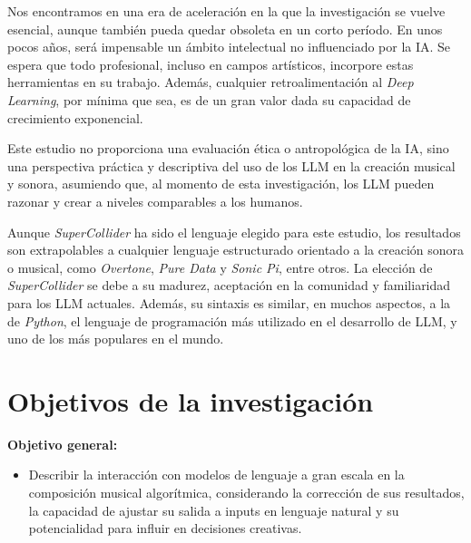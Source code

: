 Nos encontramos en una era de aceleración en la que la investigación se vuelve esencial, aunque también pueda quedar obsoleta en un corto período. En unos pocos años, será impensable un ámbito intelectual no influenciado por la IA. Se espera que todo profesional, incluso en campos artísticos, incorpore estas herramientas en su trabajo. Además, cualquier retroalimentación al \textit{Deep Learning}, por mínima que sea, es de un gran valor dada su capacidad de crecimiento exponencial.

Este estudio no proporciona una evaluación ética o antropológica de la IA, sino una perspectiva práctica y descriptiva del uso de los LLM en la creación musical y sonora, asumiendo que, al momento de esta investigación, los LLM pueden razonar y crear a niveles comparables a los humanos.

Aunque \textit{SuperCollider} ha sido el lenguaje elegido para este estudio, los resultados son extrapolables a cualquier lenguaje estructurado orientado a la creación sonora o musical, como \textit{Overtone}, \textit{Pure Data} y \textit{Sonic Pi}, entre otros. La elección de \textit{SuperCollider} se debe a su madurez, aceptación en la comunidad y familiaridad para los LLM actuales. Además, su sintaxis es similar, en muchos aspectos, a la de \textit{Python}, el lenguaje de programación más utilizado en el desarrollo de LLM, y uno de los más populares en el mundo.


\section{Objetivos de la investigación}

\textbf{Objetivo general:}
\begin{itemize}
    \item Describir la interacción con modelos de lenguaje a gran escala en la composición musical algorítmica, considerando la corrección de sus resultados, la capacidad de ajustar su salida a inputs en lenguaje natural y su potencialidad para influir en decisiones creativas.
\end{itemize}

